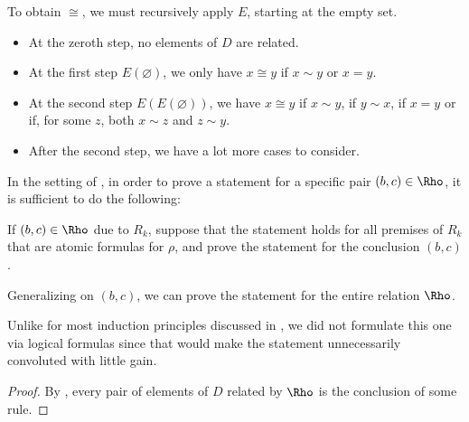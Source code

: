 \begin{example}
  To obtain \( {\cong} \), we must recursively apply \( E \), starting at the empty set.
  \begin{itemize}
    \item At the zeroth step, no elements of \( D \) are related.
    \item At the first step \( E(\varnothing) \), we only have \( x \cong y \) if \( x \sim y \) or \( x = y \).
    \item At the second step \( E(E(\varnothing)) \), we have \( x \cong y \) if \( x \sim y \), if \( y \sim x \), if \( x = y \) or if, for some \( z \), both \( x \sim z \) and \( z \sim y \).
    \item After the second step, we have a lot more cases to consider.
  \end{itemize}
\end{example}

\begin{theorem}\label{thm:induction_on_recursively_defined_relations}
  In the setting of , in order to prove a statement for a specific pair \( (b, c) \in \Rho \), it is sufficient to do the following:
  \begin{displayquote}
    If \( (b, c) \in \Rho \) due to \( R_k \), suppose that the statement holds for all premises of \( R_k \) that are atomic formulas for \( \rho \), and prove the statement for the conclusion \( (b, c) \).
  \end{displayquote}

  Generalizing on \( (b, c) \), we can prove the statement for the entire relation \( \Rho \).
\end{theorem}
\begin{comments}
  \item Unlike for most induction principles discussed in , we did not formulate this one via logical formulas since that would make the statement unnecessarily convoluted with little gain.
\end{comments}
\begin{proof}
  By , every pair of elements of \( D \) related by \( \Rho \) is the conclusion of some rule.
\end{proof}
